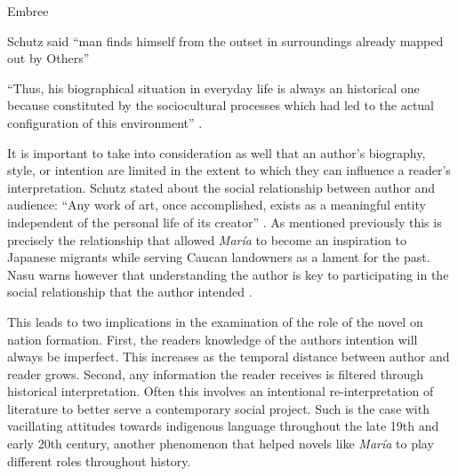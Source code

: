 Embree

Schutz said \enquote{man finds himself from the outset in surroundings already mapped out by Others} \cite[21]{Embree1998}

\enquote{Thus, his biographical situation in everyday life is always an historical one because constituted by the sociocultural processes which had led to the actual configuration of this environment} \cite[22]{Embree1998}.

It is important to take into consideration as well that an author's biography, style, or intention are limited in the extent to which they can influence a reader's interpretation.
Schutz stated about the social relationship between author and audience: \enquote{Any work of art, once accomplished, exists as a meaningful entity independent of the personal life of its creator} \cite[133]{Nasu1998}.
As mentioned previously this is precisely the relationship that allowed \textit{María} to become an inspiration to Japanese migrants while serving Caucan landowners as a lament for the past.
Nasu warns however that understanding the author is key to participating in the social relationship that the author intended \cite[134]{Nasu1998}.

This leads to two implications in the examination of the role of the novel on nation formation. 
First, the readers knowledge of the authors intention will always be imperfect.
This increases as the temporal distance between author and reader grows.
Second, any information the reader receives is filtered through historical interpretation. 
Often this involves an intentional re-interpretation of literature to better serve a contemporary social project.
Such is the case with vacillating attitudes towards indigenous language throughout the late 19th and early 20th century, another phenomenon that helped novels like \textit{María} to play different roles throughout history. 
